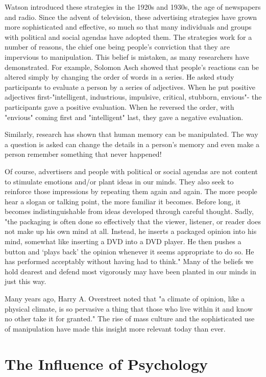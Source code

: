 \documentclass{book}
\begin{document}
Watson introduced these strategies in the 1920s and 1930s, the age of newspapers and radio. Since the advent of television, these advertising strategies have grown more sophisticated and effective, so much so that many individuals and groups with political and social agendas have adopted them. The strategies work for a number of reasons, the chief one being people’s conviction that they are impervious to manipulation. This belief is mistaken, as many researchers have demonstrated. For example, Solomon Asch showed that people’s reactions can be altered simply by changing the order of words in a series. He asked study participants to evaluate a person by a series of adjectives. When he put positive adjectives first-"intelligent, industrious, impulsive, critical, stubborn, envious"- the participants gave a positive evaluation. When he reversed the order, with "envious" coming first and "intelligent" last, they gave a negative evaluation.

Similarly, research has shown that human memory can be manipulated. The way a question is asked can change the details in a person’s memory and even make a person remember something that never happened!

Of course, advertisers and people with political or social agendas are not content to stimulate emotions and/or plant ideas in our minds. They also seek to reinforce those impressions by repeating them again and again. The more people hear a slogan or talking point, the more familiar it becomes. Before long, it becomes indistinguishable from ideas developed through careful thought. Sadly, "the packaging is often done so effectively that the viewer, listener, or reader does not make up his own mind at all. Instead, he inserts a packaged opinion into his mind, somewhat like inserting a DVD into a DVD player. He then pushes a button and ‘plays back’ the opinion whenever it seems appropriate to do so. He has performed acceptably without having had to think." Many of the beliefs we hold dearest and defend most vigorously may have been planted in our minds in just this way.

Many years ago, Harry A. Overstreet noted that "a climate of opinion, like a physical climate, is so pervasive a thing that those who live within it and know no other take it for granted." The rise of mass culture and the sophisticated use of manipulation have made this insight more relevant today than ever.

\section{The Influence of Psychology}
\end{document}
